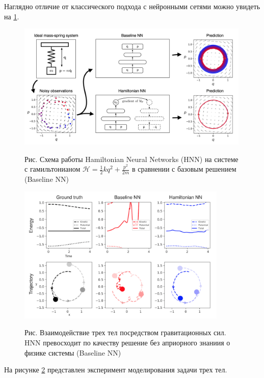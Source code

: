 Наглядно отличие от классического подхода с нейронными сетями можно увидеть на \ref{hnn}.

\begin{figure}[h]
	\centering
	\includegraphics[width=0.99\textwidth]{chapters/severilov_s2/pics/hnn}
	\label{hnn}
	\caption{Рис.  Схема работы Hamiltonian Neural Networks (HNN) на системе с гамильтонианом $
		\mathcal{H}=\frac{1}{2} k q^{2}+\frac{p^{2}}{2 m} $ в сравнении с базовым решением (Baseline NN)}
\end{figure}

\begin{figure}[h]
	\centering
	\includegraphics[width=0.89\textwidth]{chapters/severilov_s2/pics/3body_hnn}
	\label{3body_hnn}
	\caption{Рис. Взаимодействие трех тел посредством гравитационных сил. HNN превосходит по качеству решение без априорного знаниия о физике системы (Baseline NN)}
\end{figure}

На рисунке \ref{3body_hnn} представлен эксперимент моделирования задачи трех тел.

